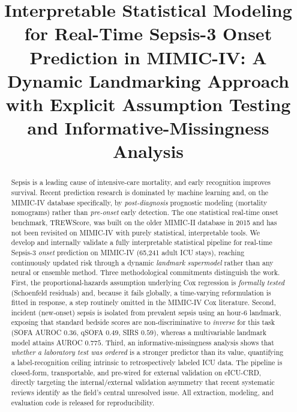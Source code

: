 \documentclass[conference]{IEEEtran}
\begin{document}
\title{Interpretable Statistical Modeling for Real-Time Sepsis-3 Onset
Prediction in MIMIC-IV: A Dynamic Landmarking Approach with Explicit
Assumption Testing and Informative-Missingness Analysis}

\author{
}

\maketitle

\begin{abstract}
Sepsis is a leading cause of intensive-care mortality, and early recognition
improves survival. Recent prediction research is dominated by machine learning
and, on the MIMIC-IV database specifically, by \emph{post-diagnosis}
prognostic modeling (mortality nomograms) rather than \emph{pre-onset} early
detection. The one statistical real-time onset benchmark, TREWScore, was built
on the older MIMIC-II database in 2015 and has not been revisited on MIMIC-IV
with purely statistical, interpretable tools. We develop and internally
validate a fully interpretable statistical pipeline for real-time Sepsis-3
\emph{onset} prediction on MIMIC-IV (65{,}241 adult ICU stays), reaching
continuously updated risk through a dynamic \emph{landmark supermodel} rather
than any neural or ensemble method. Three methodological commitments
distinguish the work. First, the proportional-hazards assumption underlying
Cox regression is \emph{formally tested} (Schoenfeld residuals) and, because it
fails globally, a time-varying reformulation is fitted in response, a step
routinely omitted in the MIMIC-IV Cox literature. Second, incident (new-onset)
sepsis is isolated from prevalent sepsis using an hour-6 landmark, exposing
that standard bedside scores are non-discriminative to \emph{inverse} for this
task (SOFA AUROC $0.36$, qSOFA $0.49$, SIRS $0.59$), whereas a multivariable
landmark model attains AUROC $0.775$. Third, an informative-missingness
analysis shows that \emph{whether a laboratory test was ordered} is a stronger
predictor than its value, quantifying a label-recognition ceiling intrinsic to
retrospectively labeled ICU data. The pipeline is closed-form, transportable,
and pre-wired for external validation on eICU-CRD, directly targeting the
internal/external validation asymmetry that recent systematic reviews identify
as the field's central unresolved issue. All extraction, modeling, and
evaluation code is released for reproducibility.
\end{abstract}
\end{document}
